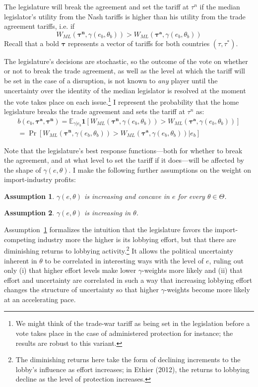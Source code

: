 \documentclass[10pt]{article}
\newtheorem{assumption}{Assumption}
\newcommand{\ve}{\theta}
\newcommand{\ta}{\theta}
\newcommand{\expect}{\mathbb{E}}
\newcommand{\bta}{\bm{\tau^a}}
\newcommand{\btn}{\bm{\tau^n}}
\newcommand{\ga}{\gamma}
\begin{document}
The legislature will break the agreement and set the tariff at $\tau^n$ if the median legislator's utility from the Nash tariffs is higher than his utility from the trade agreement tariffs, i.e. if
\begin{equation}
  W_{ML}(\btn,\ga(e_b,\ve_b)) > W_{ML}\left(\bta,\ga(e_b,\ve_b)\right)
  \label{eq:lwcg}
\end{equation}
\noindent Recall that a bold $\bm{\tau}$ represents a vector of tariffs for both countries $(\tau,\tau^*)$.
  
The legislature's decisions are stochastic, so the outcome of the vote on whether or not to break the trade agreement, as well as the level at which the tariff will be set in the case of a disruption, is not known to \textit{any} player until the uncertainty over the identity of the median legislator is resolved at the moment the vote takes place on each issue.\footnote{We might think of the trade-war tariff as being set in the legislation before a vote takes place in the case of administered protection for instance; the results are robust to this variant.} I represent the probability that the home legislature breaks the trade agreement and sets the tariff at $\tau^n$ as:
\begin{multline}
  b(e_b,\bta,\btn) = \expect_{\ga|e_b} \bm{1} [ W_{ML}(\btn,\ga(e_b,\ve_b)) > W_{ML}\left(\bta,\ga(e_b,\ve_b)\right) ] \\ = \Pr [ W_{ML}(\btn,\ga(e_b,\ve_b)) > W_{ML}\left(\bta,\ga(e_b,\ve_b)\right) | e_b]
  \label{eq:b}
\end{multline}

Note that the legislature's best response functions---both for whether to break the agreement, and at what level to set the tariff if it does---will be affected by the shape of $\ga(e,\ve)$. I make the following further assumptions on the weight on import-industry profits:

\begin{assumption}
  $\ga(e,\ta)$ is increasing and concave in $e$ for every $\ta \in \Theta$.
  \label{as:ga_c}
\end{assumption}

\begin{assumption}
  $\ga(e,\ta)$ is increasing in $\ta$.
  \label{as:ga_ta}
\end{assumption}

Assumption~\ref{as:ga_c} formalizes the intuition that the legislature favors the import-competing industry more the higher is its lobbying effort, but that there are diminishing returns to lobbying activity.\footnote{The diminishing returns here take the form of declining increments to the lobby's influence as effort increases; in Ethier (2012), the returns to lobbying decline as the level of protection increases.} It allows the political uncertainty inherent in $\ta$ to be correlated in interesting ways with the level of $e$, ruling out only (i) that higher effort levels make lower $\ga$-weights more likely and (ii) that effort and uncertainty are correlated in such a way that increasing lobbying effort changes the structure of uncertainty so that higher $\ga$-weights become more likely at an accelerating pace.
\end{document}
